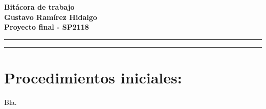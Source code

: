 \documentclass[letter]{article}
\newcommand{\entitle}[1]{
  \vspace{0.3cm}%
  \noindent%
  \textbf{#1}%
  \vspace{0.2cm}%
  \hrule\vspace*{0.5mm}%
  \noindent%
  \rule{\linewidth}{0.5mm}%
  \vspace{0.5cm}%
}%
\begin{document}

\newcommand{\uic}{blue} %
\newcommand{\uim}{\_\_} %
\newcommand{\userinput}[1]{\textcolor{\uic}{\uim#1\uim}}
























\begin{center}
\entitle{Bitácora de trabajo \\ Gustavo Ramírez Hidalgo \\ Proyecto final - SP2118}
\end{center}







\section{\normalsize Procedimientos iniciales:}
Bla.
\end{document}

